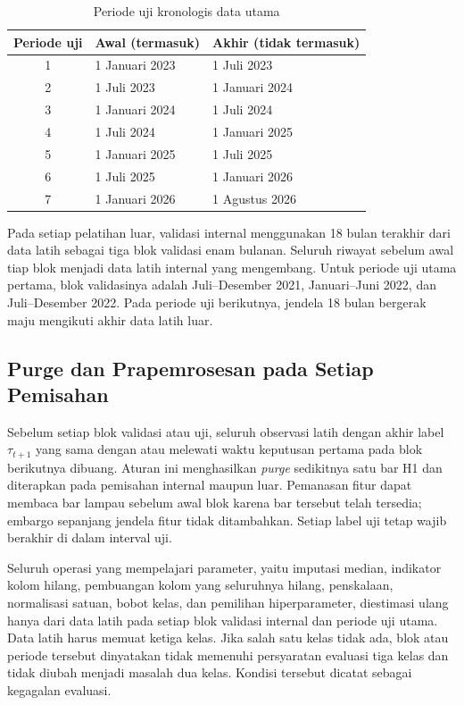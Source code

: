 \begin{table}[htbp]
    \centering
    \caption{Periode uji kronologis data utama}
    \label{tab:periode-utama}
    \begin{tabular}{cll}
        \hline
        Periode uji & Awal (termasuk) & Akhir (tidak termasuk) \\
        \hline
        1 & 1 Januari 2023 & 1 Juli 2023 \\
        2 & 1 Juli 2023 & 1 Januari 2024 \\
        3 & 1 Januari 2024 & 1 Juli 2024 \\
        4 & 1 Juli 2024 & 1 Januari 2025 \\
        5 & 1 Januari 2025 & 1 Juli 2025 \\
        6 & 1 Juli 2025 & 1 Januari 2026 \\
        7 & 1 Januari 2026 & 1 Agustus 2026 \\
        \hline
    \end{tabular}
\end{table}

Pada setiap pelatihan luar, validasi internal menggunakan 18 bulan terakhir dari data latih sebagai tiga blok validasi enam bulanan. Seluruh riwayat sebelum awal tiap blok menjadi data latih internal yang mengembang. Untuk periode uji utama pertama, blok validasinya adalah Juli--Desember 2021, Januari--Juni 2022, dan Juli--Desember 2022. Pada periode uji berikutnya, jendela 18 bulan bergerak maju mengikuti akhir data latih luar.

\subsection{Purge dan Prapemrosesan pada Setiap Pemisahan}

Sebelum setiap blok validasi atau uji, seluruh observasi latih dengan akhir label $\tau_{t+1}$ yang sama dengan atau melewati waktu keputusan pertama pada blok berikutnya dibuang. Aturan ini menghasilkan \emph{purge} sedikitnya satu bar H1 dan diterapkan pada pemisahan internal maupun luar. Pemanasan fitur dapat membaca bar lampau sebelum awal blok karena bar tersebut telah tersedia; embargo sepanjang jendela fitur tidak ditambahkan. Setiap label uji tetap wajib berakhir di dalam interval uji.

Seluruh operasi yang mempelajari parameter, yaitu imputasi median, indikator kolom hilang, pembuangan kolom yang seluruhnya hilang, penskalaan, normalisasi satuan, bobot kelas, dan pemilihan hiperparameter, diestimasi ulang hanya dari data latih pada setiap blok validasi internal dan periode uji utama. Data latih harus memuat ketiga kelas. Jika salah satu kelas tidak ada, blok atau periode tersebut dinyatakan tidak memenuhi persyaratan evaluasi tiga kelas dan tidak diubah menjadi masalah dua kelas. Kondisi tersebut dicatat sebagai kegagalan evaluasi.

